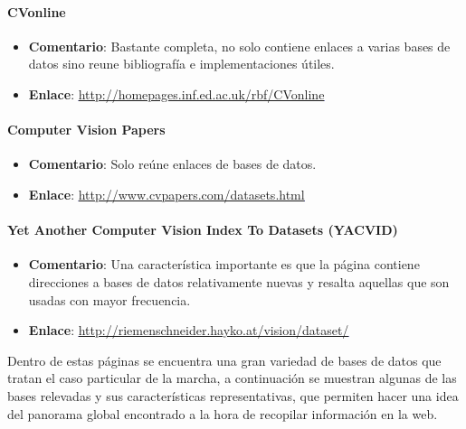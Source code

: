 \paragraph{\textbf{CVonline}}

	\begin{itemize}
		\item \textbf{Comentario}: Bastante completa, no solo contiene enlaces a  varias bases de datos sino reune bibliografía e implementaciones útiles.
		\item \textbf{Enlace}: \textcolor{blue}{\underline{\url{http://homepages.inf.ed.ac.uk/rbf/CVonline}}}
	\end{itemize}

\paragraph{\textbf{Computer Vision Papers}}
	\begin{itemize}
		\item \textbf{Comentario}: Solo reúne enlaces de bases de datos.
		\item \textbf{Enlace}: \textcolor{blue}{\underline{\url{ http://www.cvpapers.com/datasets.html}}}
	\end{itemize}
	
\paragraph{\textbf{Yet Another Computer Vision Index To Datasets (YACVID)}}		
	\begin{itemize}
		\item \textbf{Comentario}: Una característica importante es que la página contiene direcciones a bases de datos relativamente nuevas y resalta aquellas que son usadas con mayor frecuencia. 
		\item \textbf{Enlace}: \textcolor{blue}{\underline{\url{http://riemenschneider.hayko.at/vision/dataset/}}}
	\end{itemize}

Dentro de estas páginas se encuentra una gran variedad de bases de datos que tratan el caso particular de la marcha, a continuación se muestran algunas de las bases relevadas y sus características representativas, que permiten hacer una idea del panorama global encontrado a la hora de recopilar información en la web.  

